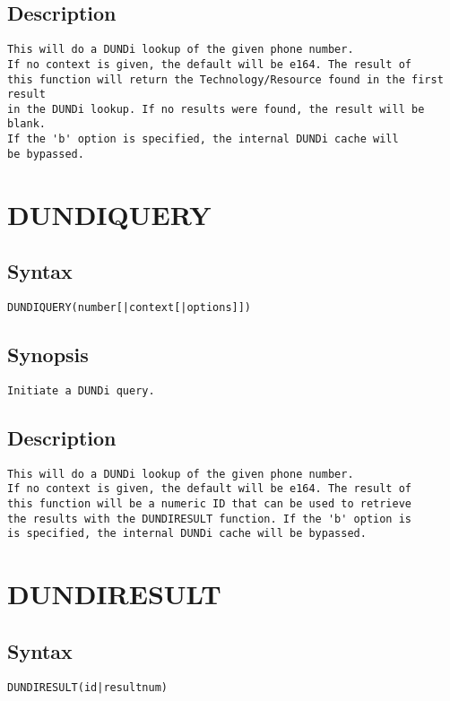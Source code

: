 \subsection{Description}
\begin{verbatim}
This will do a DUNDi lookup of the given phone number.
If no context is given, the default will be e164. The result of
this function will return the Technology/Resource found in the first result
in the DUNDi lookup. If no results were found, the result will be blank.
If the 'b' option is specified, the internal DUNDi cache will
be bypassed.

\end{verbatim}


\section{DUNDIQUERY}
\subsection{Syntax}
\begin{verbatim}
DUNDIQUERY(number[|context[|options]])
\end{verbatim}
\subsection{Synopsis}
\begin{verbatim}
Initiate a DUNDi query.
\end{verbatim}
\subsection{Description}
\begin{verbatim}
This will do a DUNDi lookup of the given phone number.
If no context is given, the default will be e164. The result of
this function will be a numeric ID that can be used to retrieve
the results with the DUNDIRESULT function. If the 'b' option is
is specified, the internal DUNDi cache will be bypassed.

\end{verbatim}


\section{DUNDIRESULT}
\subsection{Syntax}
\begin{verbatim}
DUNDIRESULT(id|resultnum)
\end{verbatim}
